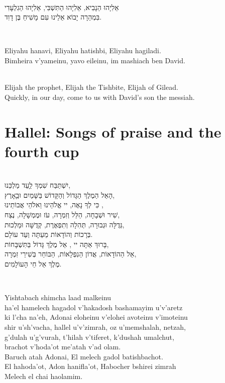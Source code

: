 \documentclass[12pt,a4wide,openany]{memoir}
\newcommand{\HgInst}[1]{{\noindent\sffamily{\bfseries{#1}}}}
\newcommand{\ch}{ch}
\newenvironment{HgHebrew}{\begin{hebrew}\strut\\\noindent\Large}{\end{hebrew}}
\newenvironment{HgHebrewl}{\begin{hebrew}\strut\\\noindent\large}{\end{hebrew}}
\newenvironment{HgEnglish}{\strut\\\noindent}{\vspace{1em}}
\newenvironment{HgTranslit}{\strut\\\noindent\begin{itshape}}{\end{itshape}\vspace{1em}}
\begin{document}
\begin{HgHebrew}
  אֵלִיָהוּ הַנָבִיא, אֵלִיָהוּ הַתִּשְׁבִּי, אֵלִיָהוּ הַגִלְעָדִי 
  \\
  בִּמְהֵרָה יָבוֹא אֵלֵינוּ עִם מָשִׁיחַ בֶּן דָוִד.
\end{HgHebrew}

\begin{HgTranslit}
  Eliyahu hanavi, Eliyahu hatishbi, Eliyahu hagiladi. \\
  Bimheira v'yameinu, yavo eileinu, im mashiach ben David.
\end{HgTranslit}
\vspace{-1em}

\begin{HgEnglish}
  Elijah the prophet, Elijah the Tishbite, Elijah of Gilead. \\
  Quickly, in our day, come to us with David's son the messiah.
\end{HgEnglish}

\vfill

\chapter{Hallel: Songs of praise and the fourth cup}

\HgInst{Recite:}

\begin{HgHebrewl}
  יִשְׁתַּבַּח שִׁמְךָ לַָעַד מַלְכֵּנוּ,  \\
  הָאֵל הַמֶלֶךְ הַגָּדוֹל וְהַקָּדוֹשׁ בַּשָּׁמַיִם וּבַָאָרֶץ, \\
  כִּי לְךָ נָאֶה, יי אֱלֹהֵינוּ וֵאלֹהֵי אֲבוֹתֵינוּ ,  \\
  שִׁיר וּשְׁבָחָה, הַלֵּל וְזִמְרָה, עֹז וּמֶמְשָׁלָה, נֶצַח,  \\
  גְּדֻלָּה וּגְבוּרָה, תְּהִלָה וְתִפְאֶרֶת, קְדֻשָּׁה וּמַלְכוּת, \\
  בְּרָכוֹת וְהוֹדָאוֹת מֵעַתָּה וְעַד עוֹלָם.  \\
  בָּרוּךְ אַתָּה יי , אֵל מֶלֶךְ גָּדוֹל בַּתִּשְׁבָּחוֹת,  \\
  אֵל הַהוֹדָאוֹת, אֲדוֹן הַנִפְלָאוֹת, הַבּוֹחֵר בְּשִׁירֵי זִמְרָה,  \\
  מֶלֶךְ אֵל חֵי הָעוֹלָמִים. 
\end{HgHebrewl}

\begin{HgTranslit}\raggedright
  Yishtaba{\ch} shim{\ch}a laad malkeinu \\
  ha'el hamele{\ch} hagadol v'hakadosh bashamayim u'v'aretz \\
  ki l'{\ch}a na'eh, Adonai eloheinu v'elohei avoteinu v'imoteinu\\
  shir u'sh'va{\ch}a, hallel u'v'zimrah, oz u'memshalah, netzah, \\
  g'dulah u'g'vurah, t'hilah v'tiferet, k'dushah umal{\ch}ut, \\
  bra{\ch}ot v'hoda'ot me'atah v'ad olam. \\
  Baru{\ch} atah Adonai, El mele{\ch} gadol batishba{\ch}ot. \\
  El hahoda'ot, Adon hanifla'ot, Habo{\ch}er bshirei zimrah \\
  Mele{\ch} el {\ch}ai haolamim.
\end{HgTranslit}
\end{document}
